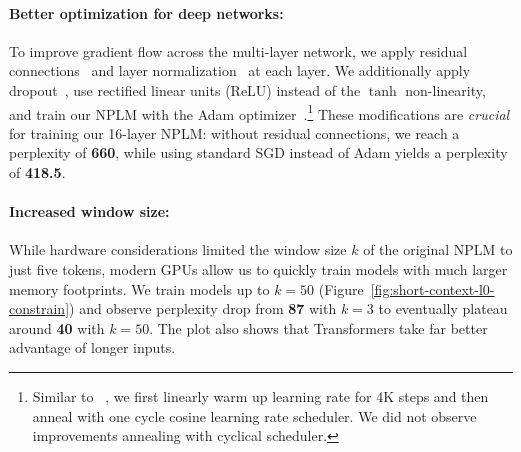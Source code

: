 \documentclass[11pt]{article}
\begin{document}
\paragraph{Better optimization for deep networks:} To improve gradient flow across the multi-layer network, we apply residual connections~\citep{he2016deep} and layer normalization~\citep{ba2016layer} at each layer. We additionally apply dropout~\citep{JMLR:v15:srivastava14a}, use rectified linear units (ReLU) instead of the $\tanh$ non-linearity, and train our NPLM with the Adam optimizer~\citep{kingma2015adam}.\footnote{Similar to ~\citet{baevski2018adaptive}, we first linearly warm up learning rate for 4K steps and then anneal with one cycle cosine learning rate scheduler. We did not observe improvements annealing with cyclical scheduler.} These modifications are \emph{crucial} for training our 16-layer NPLM: without residual connections, we reach a perplexity of \textbf{660}, while using standard SGD instead of Adam yields a perplexity of \textbf{418.5}.

\paragraph{Increased window size:} While hardware considerations limited the window size $k$ of the original NPLM to just five tokens, modern GPUs allow us to quickly train models with much larger memory footprints. We train models up to $k=50$ (Figure~\ref{fig:short-context-l0-constrain}) and observe perplexity drop from \textbf{87} with $k=3$ to eventually plateau around \textbf{40} with $k=50$. The plot also shows that Transformers take far better advantage of longer inputs.
\end{document}
